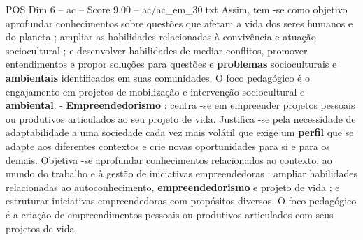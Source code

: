 \begin{textsample}{POS Dim 6 – ac – Score 9.00 – ac/ac\_em\_30.txt}
Assim, tem -se como objetivo aprofundar conhecimentos sobre questões que afetam a vida dos seres humanos e do planeta ; ampliar as habilidades relacionadas à convivência e atuação sociocultural ; e desenvolver habilidades de mediar conflitos, promover entendimentos e propor soluções para questões e \textbf{problemas} socioculturais e \textbf{ambientais} identificados em suas comunidades.
O foco pedagógico é o engajamento em projetos de mobilização e intervenção sociocultural e \textbf{ambiental}. - \textbf{Empreendedorismo} : centra -se em empreender projetos pessoais ou produtivos articulados ao seu projeto de vida.
Justifica -se pela necessidade de adaptabilidade a uma sociedade cada vez mais volátil que exige um \textbf{perfil} que se adapte aos diferentes contextos e crie novas oportunidades para si e para os demais.
Objetiva -se aprofundar conhecimentos relacionados ao contexto, ao mundo do trabalho e à gestão de iniciativas empreendedoras ; ampliar habilidades relacionadas ao autoconhecimento, \textbf{empreendedorismo} e projeto de vida ; e estruturar iniciativas empreendedoras com propósitos diversos.
O foco pedagógico é a criação de empreendimentos pessoais ou produtivos articulados com seus projetos de vida.

\end{textsample}
